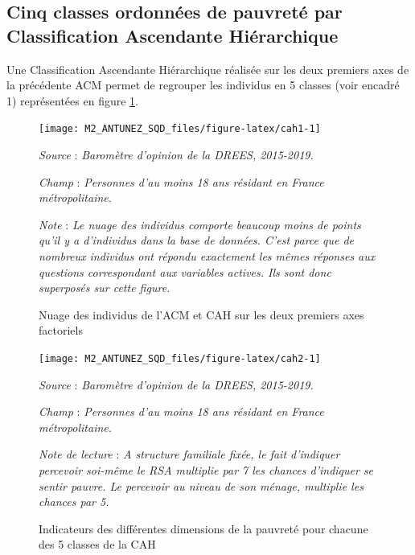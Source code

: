 \documentclass[12pt,a4paper]{reedthesis}
\begin{document}
\hypertarget{sec:esexplodescriCAH}{%
\subsection{Cinq classes ordonnées de pauvreté par Classification Ascendante Hiérarchique}\label{sec:esexplodescriCAH}}

Une Classification Ascendante Hiérarchique réalisée sur les deux premiers axes de la précédente ACM permet de regrouper les individus en 5 classes (voir encadré 1) représentées en figure \ref{fig:cah1}.
\begin{figure}[!ht]

{\centering \texttt{[image: M2\_ANTUNEZ\_SQD\_files/figure-latex/cah1-1]} 

}

\caption[Nuage des individus de l'ACM et CAH sur les deux premiers axes factoriels]{Nuage des individus de l'ACM et CAH sur les deux premiers axes factoriels}\label{fig:cah1}

\footnotesize


\emph{Source} : \emph{Baromètre d’opinion de la DREES, 2015-2019.}


\emph{Champ} : \emph{Personnes d’au moins 18 ans résidant en France métropolitaine.}


\emph{Note} : \emph{Le nuage des individus comporte beaucoup moins de points qu’il y a d’individus dans la base de données. C’est parce que de nombreux individus ont répondu exactement les mêmes réponses aux questions correspondant aux variables actives. Ils sont donc superposés sur cette figure.}
\normalsize\end{figure}
\begin{figure}[!ht]

{\centering \texttt{[image: M2\_ANTUNEZ\_SQD\_files/figure-latex/cah2-1]} 

}

\caption[Indicateurs des différentes dimensions de la pauvreté pour chacune des 5 classes de la CAH]{Indicateurs des différentes dimensions de la pauvreté pour chacune des 5 classes de la CAH}\label{fig:cah2}

\footnotesize


\emph{Source} : \emph{Baromètre d’opinion de la DREES, 2015-2019.}


\emph{Champ} : \emph{Personnes d’au moins 18 ans résidant en France métropolitaine.}


\emph{Note de lecture} : \emph{A structure familiale fixée, le fait d'indiquer percevoir soi-même le RSA multiplie par 7 les chances d'indiquer se sentir pauvre. Le percevoir au niveau de son ménage, multiplie les chances par 5.}
\normalsize\end{figure}
\end{document}
